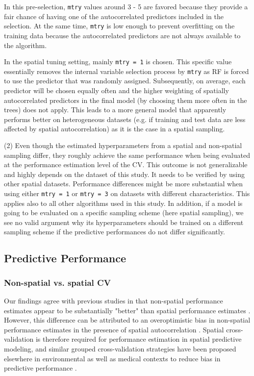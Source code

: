 \documentclass[review]{elsarticle}
\begin{document}
In this pre-selection, \texttt{mtry} values around 3 - 5 are favored because they provide a fair chance of having one of the autocorrelated predictors included in the selection.
At the same time, \texttt{mtry} is low enough to prevent overfitting on the training data because the autocorrelated predictors are not always available to the algorithm.

In the spatial tuning setting, mainly \texttt{mtry = 1} is chosen.
This specific value essentially removes the internal variable selection process by \texttt{mtry} as RF is forced to use the predictor that was randomly assigned.
Subsequently, on average, each predictor will be chosen equally often and the higher weighting of spatially autocorrelated predictors in the final model (by choosing them more often in the trees) does not apply.
This leads to a more general model that apparently performs better on heterogeneous datasets (e.g. if training and test data are less affected by spatial autocorrelation) as it is the case in a spatial sampling.

(2) Even though the estimated hyperparameters from a spatial and non-spatial sampling differ, they roughly achieve the same performance when being evaluated at the performance estimation level of the CV.
This outcome is not generalizable and highly depends on the dataset of this study.
It needs to be verified by using other spatial datasets.
Performance differences might be more substantial when using either \texttt{mtry = 1} or \texttt{mtry = 3} on datasets with different characteristics.
This applies also to all other algorithms used in this study.
In addition, if a model is going to be evaluated on a specific sampling scheme (here spatial sampling), we see no valid argument why its hyperparameters should be trained on a different sampling scheme if the predictive performances do not differ significantly.

\subsection{Predictive Performance}

\subsubsection{Non-spatial vs. spatial CV}
Our findings agree with previous studies in that non-spatial performance estimates appear to be substantially "better" than spatial performance estimates \citep{Meyer2018, Micheletti2013, Roberts2017}.
However, this difference can be attributed to an overoptimistic bias in non-spatial performance estimates in the presence of spatial autocorrelation \citep{Goetz2015, Meyer2018, Russ2010a, Steger2016}.
Spatial cross-validation is therefore required for performance estimation in spatial predictive modeling, and similar grouped cross-validation strategies have been proposed elsewhere in environmental as well as medical contexts to reduce bias in predictive performance \citep{Brenning2008, Meyer2018, Pena2015, Pohjankukka2017, Roberts2017}.
\end{document}
